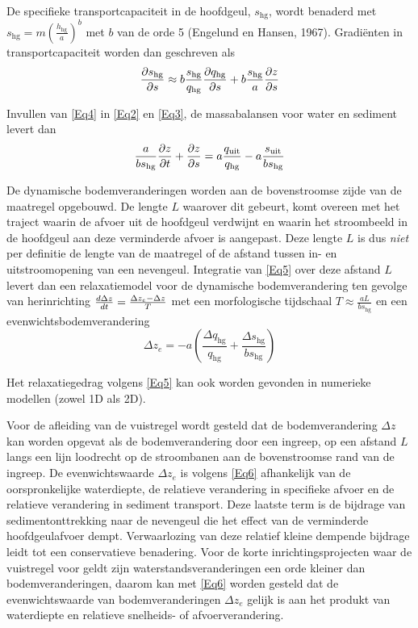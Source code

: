 De specifieke transportcapaciteit in de hoofdgeul, $s_\text{hg}$, wordt benaderd met $s_\text{hg} = m \left ( \frac{h_\text{hg}}{a} \right )^b$ met $b$ van de orde 5 (Engelund en Hansen, 1967).
Gradi\"enten in transportcapaciteit worden dan geschreven als
%
\begin{equation}
\pdiff{s_\text{hg}}{s} \approx b \frac{s_\text{hg}}{q_\text{hg}} \pdiff{q_\text{hg}}{s} + b \frac{s_\text{hg}}{a} \pdiff{z}{s}
\label{Eq4}
\end{equation}

Invullen van \autoref{Eq4} in \autoref{Eq2} en \autoref{Eq3}, de massabalansen voor water en sediment levert dan
%
\begin{equation}
\frac{a}{b s_\text{hg}} \pdiff{z}{t} + \pdiff{z}{s} = a \frac{q_\text{uit}}{q_\text{hg}} - a \frac{s_\text{uit}}{b s_\text{hg}}
\label{Eq5}
\end{equation}

De dynamische bodemveranderingen worden aan de bovenstroomse zijde van de maatregel opgebouwd.
De lengte $L$ waarover dit gebeurt, komt overeen met het traject waarin de afvoer uit de hoofdgeul verdwijnt en waarin het stroombeeld in de hoofdgeul aan deze verminderde afvoer is aangepast.
Deze lengte $L$ is dus \emph{niet} per definitie de lengte van de maatregel of de afstand tussen in- en uitstroomopening van een
nevengeul.
Integratie van \autoref{Eq5} over deze afstand $L$ levert dan een relaxatiemodel voor de dynamische bodemverandering ten gevolge van herinrichting $\diff{\Delta z}{t} = \frac{\Delta z_e - \Delta z}{T}$ met een morfologische tijdschaal $T \approx \frac{a L}{bs_\text{hg}}$ en een evenwichtsbodemverandering
%
\begin{equation}
\Delta z_e = -a \left ( \frac{\Delta q_\text{hg}}{q_\text{hg}} + \frac{\Delta s_\text{hg}}{b s_\text{hg}} \right )
\label{Eq6}
\end{equation}

Het relaxatiegedrag volgens \autoref{Eq5} kan ook worden gevonden in numerieke modellen (zowel 1D als 2D).

Voor de afleiding van de vuistregel wordt gesteld dat de bodemverandering $\Delta z$ kan worden opgevat als de bodemverandering door een ingreep, op een afstand $L$ langs een lijn loodrecht op de stroombanen aan de bovenstroomse rand van de ingreep.
De evenwichtswaarde $\Delta z_e$ is volgens \autoref{Eq6} afhankelijk van de oorspronkelijke waterdiepte, de relatieve verandering in specifieke afvoer en de relatieve verandering in sediment transport.
Deze laatste term is de bijdrage van sedimentonttrekking naar de nevengeul die het effect van de verminderde hoofdgeulafvoer dempt.
Verwaarlozing van deze relatief kleine dempende bijdrage leidt tot een conservatieve benadering.
Voor de korte inrichtingsprojecten waar de vuistregel voor geldt zijn waterstandsveranderingen een orde kleiner dan bodemveranderingen, daarom kan met \autoref{Eq6} worden gesteld dat de evenwichtswaarde van bodemveranderingen $\Delta z_e$ gelijk is aan het produkt van waterdiepte en relatieve snelheids- of afvoerverandering.

